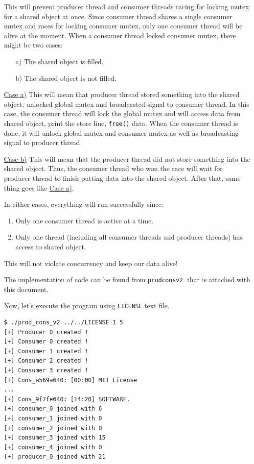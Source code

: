 \documentclass{homework}
\begin{document}
This will prevent producer thread and consumer threads racing for locking mutex for a shared object at once. Since consumer thread shares a single consumer mutex and races for locking consumer mutex, only one consumer thread will be alive at the moment. When a consumer thread locked consumer mutex, there might be two cases:

\begin{itemize}
   \item[a)] The shared object is filled.
   \item[b)] The shared object is not filled.
\end{itemize}

\underline{Case a)} This will mean that producer thread stored something into the shared object, unlocked global mutex and broadcasted signal to consumer thread. In this case, the consumer thread will lock the global mutex and will access data from shared object, print the store line, \texttt{free()} data. When the consumer thread is done, it will unlock global mutex and consumer mutex as well as broadcasting signal to producer thread.

\underline{Case b)} This will mean that the producer thread did not store something into the shared object. Thus, the consumer thread who won the race will wait for producer thread to finish putting data into the shared object. After that, same thing goes like \underline{Case a)}.
\par

In either cases, everything will run successfully since:
\begin{enumerate}
   \item Only one consumer thread is active at a time.
   \item Only one thread (including all consumer threads and producer threads) has access to shared object.
\end{enumerate}
This will not violate concurrency and keep our data alive!
\par

The implementation of code can be found from \texttt{prod\textunderscore cons\textunderscore v2}. that is attached with this document.
\par

Now, let's execute the program using \texttt{LICENSE} text file.
\\
\begin{center}
\begin{code}
\begin{verbatim}
$ ./prod_cons_v2 ../../LICENSE 1 5
[+] Producer 0 created !
[+] Consumer 0 created !
[+] Consumer 1 created !
[+] Consumer 2 created !
[+] Consumer 3 created !
[+] Cons_a569a640: [00:00] MIT License
...
[+] Cons_9f7fe640: [14:20] SOFTWARE.
[+] consumer_0 joined with 6
[+] consumer_1 joined with 0
[+] consumer_2 joined with 0
[+] consumer_3 joined with 15
[+] consumer_4 joined with 0
[+] producer_0 joined with 21

\end{verbatim}
\end{code}
\end{center}
\end{document}
